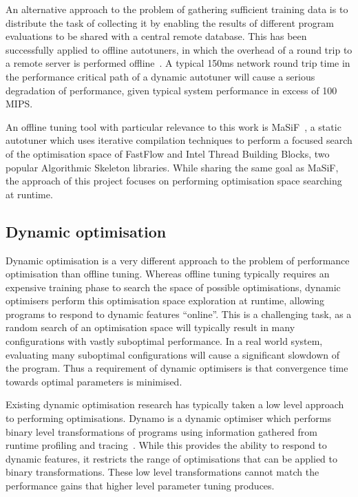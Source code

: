 An alternative approach to the problem of gathering sufficient
training data is to distribute the task of collecting it by enabling
the results of different program evaluations to be shared with a
central remote database. This has been successfully applied to offline
autotuners, in which the overhead of a round trip to a remote server
is performed offline~\cite{Fursin2014, Auler2014}. A typical 150ms
network round trip time in the performance critical path of a dynamic
autotuner will cause a serious degradation of performance, given
typical system performance in excess of 100 MIPS.

An offline tuning tool with particular relevance to this work is
MaSiF~\cite{Collins2013}, a static autotuner which uses iterative
compilation techniques to perform a focused search of the optimisation
space of FastFlow and Intel Thread Building Blocks, two popular
Algorithmic Skeleton libraries. While sharing the same goal as MaSiF,
the approach of this project focuses on performing optimisation space
searching at runtime.

\newpage

\subsection{Dynamic optimisation}\label{subsec:dynamic-optimisation}
Dynamic optimisation is a very different approach to the problem of
performance optimisation than offline tuning. Whereas offline tuning
typically requires an expensive training phase to search the space of
possible optimisations, dynamic optimisers perform this optimisation
space exploration at runtime, allowing programs to respond to dynamic
features ``online''. This is a challenging task, as a random search of
an optimisation space will typically result in many configurations
with vastly suboptimal performance. In a real world system, evaluating
many suboptimal configurations will cause a significant slowdown of
the program. Thus a requirement of dynamic optimisers is that
convergence time towards optimal parameters is minimised.

Existing dynamic optimisation research has typically taken a low level
approach to performing optimisations. Dynamo is a dynamic optimiser
which performs binary level transformations of programs using
information gathered from runtime profiling and
tracing~\cite{Bala2000}. While this provides the ability to respond to
dynamic features, it restricts the range of optimisations that can be
applied to binary transformations. These low level transformations
cannot match the performance gains that higher level parameter tuning
produces.

